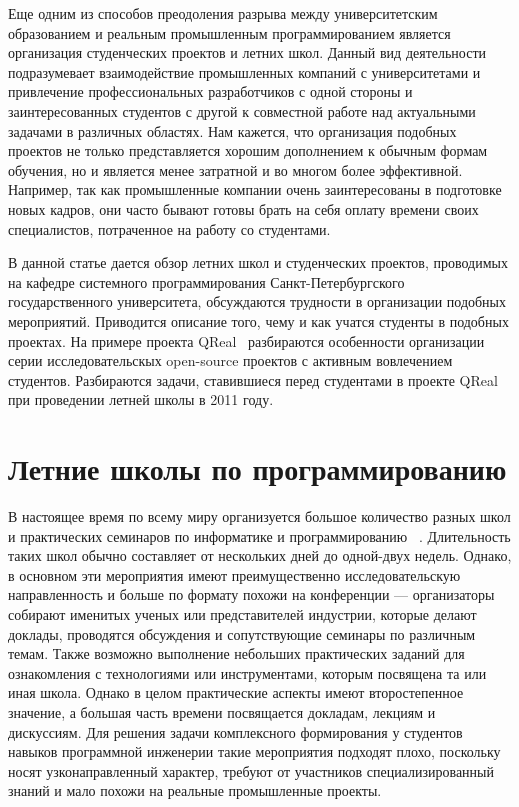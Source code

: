 \documentclass[a4paper]{article}
\begin{document}
Еще одним из способов преодоления разрыва между университетским образованием и реальным промышленным программированием является организация студенческих проектов и летних школ. Данный вид деятельности подразумевает взаимодействие промышленных компаний с университетами и привлечение профессиональных разработчиков с одной стороны и заинтересованных студентов с другой к совместной работе над актуальными задачами в различных областях. Нам кажется, что организация подобных проектов не только представляется хорошим дополнением к обычным формам обучения, но и является менее затратной и во многом более эффективной. Например, так как промышленные компании очень заинтересованы в подготовке новых кадров, они часто бывают готовы брать на себя оплату времени своих специалистов, потраченное на работу со студентами. 
 
В данной статье дается обзор летних школ и студенческих проектов, проводимых на кафедре системного программирования Санкт-Петербургского государственного университета, обсуждаются трудности в организации подобных мероприятий. Приводится описание того, чему и как учатся студенты в подобных проектах. На примере проекта QReal~\cite{qreal2, qreal3, qreal} разбираются особенности организации серии исследовательскых open-source проектов с активным вовлечением студентов. Разбираются задачи, ставившиеся перед студентами в проекте QReal при проведении летней школы в 2011 году.

\section{Летние школы по программированию}

В настоящее время по всему миру организуется большое количество разных школ и практических семинаров по информатике и программированию ~\cite{schoolList}. Длительность таких школ обычно составляет от нескольких дней до одной-двух недель. Однако, в основном эти мероприятия имеют преимущественно исследовательскую направленность  и больше по формату похожи на конференции --- организаторы собирают именитых ученых или представителей индустрии, которые делают доклады, проводятся обсуждения и сопутствующие семинары по различным темам. Также возможно выполнение небольших практических заданий для ознакомления с технологиями или инструментами, которым посвящена та или иная школа. Однако в целом практические аспекты имеют второстепенное значение, а большая часть времени посвящается докладам, лекциям и дискуссиям. Для решения задачи комплексного формирования у студентов навыков программной инженерии такие мероприятия подходят плохо, поскольку носят узконаправленный характер, требуют от участников специализированный знаний и мало похожи на  реальные промышленные проекты.
\end{document}
